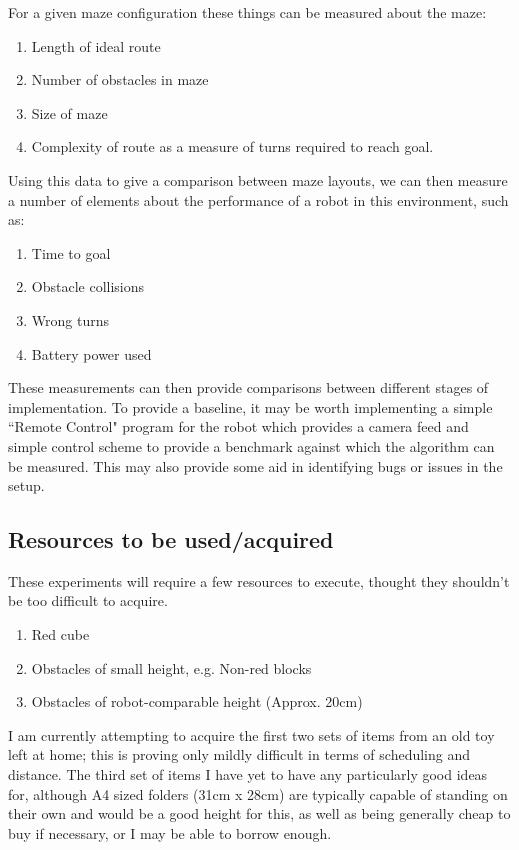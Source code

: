 \documentclass[10pt,a4paper]{report}
\begin{document}
		For a given maze configuration these things can be measured about the maze:
		\begin{enumerate}
			\item Length of ideal route
			\item Number of obstacles in maze
			\item Size of maze
			\item Complexity of route as a measure of turns required to reach goal.
		\end{enumerate}
		Using this data to give a comparison between maze layouts, we can then measure a number of elements about the performance of a robot in this environment, such as:
		\begin{enumerate}
			\item Time to goal
			\item Obstacle collisions
			\item Wrong turns
			\item Battery power used
		\end{enumerate}
		These measurements can then provide comparisons between different stages of implementation. To provide a baseline, it may be worth implementing a simple ``Remote Control" program for the robot which provides a camera feed and simple control scheme to provide a benchmark against which the algorithm can be measured. This may also provide some aid in identifying bugs or issues in the setup.
	
	\subsection*{Resources to be used/acquired}
		These experiments will require a few resources to execute, thought they shouldn't be too difficult to acquire. 
		\begin{enumerate}
			\item Red cube
			\item Obstacles of small height, e.g. Non-red blocks
			\item Obstacles of robot-comparable height (Approx. 20cm)
		\end{enumerate}
		I am currently attempting to acquire the first two sets of items from an old toy left at home; this is proving only mildly difficult in terms of scheduling and distance. The third set of items I have yet to have any particularly good ideas for, although A4 sized folders (31cm x 28cm) are typically capable of standing on their own and would be a good height for this, as well as being generally cheap to buy if necessary, or I may be able to borrow enough.
		
\end{document}
